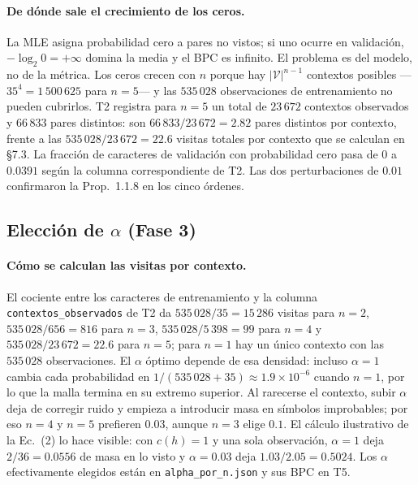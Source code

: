 \documentclass[11pt,letterpaper]{article}
\begin{document}
	\paragraph{De dónde sale el crecimiento de los ceros.}
	La MLE asigna probabilidad cero a pares no vistos; si uno ocurre en validación, $-\log_2 0 = +\infty$ domina la media y el BPC es infinito. El problema es del modelo, no de la métrica. Los ceros crecen con $n$ porque hay $|\mathcal{V}|^{n-1}$ contextos posibles ---$35^4 = 1\,500\,625$ para $n = 5$--- y las $535\,028$ observaciones de entrenamiento no pueden cubrirlos. T2 registra para $n = 5$ un total de $23\,672$ contextos observados y $66\,833$ pares distintos: son $66\,833 / 23\,672 = 2.82$ pares distintos por contexto, frente a las $535\,028 / 23\,672 = 22.6$ visitas totales por contexto que se calculan en \S 7.3. La fracción de caracteres de validación con probabilidad cero pasa de $0$ a $0.0391$ según la columna correspondiente de T2. Las dos perturbaciones de $0.01$ confirmaron la Prop.~1.1.8 en los cinco órdenes.
	
	\subsection{Elección de $\alpha$ (Fase 3)}
	
	\paragraph{Cómo se calculan las visitas por contexto.}
	El cociente entre los caracteres de entrenamiento y la columna \texttt{contextos\_observados} de T2 da $535\,028 / 35 = 15\,286$ visitas para $n = 2$, $535\,028 / 656 = 816$ para $n = 3$, $535\,028 / 5\,398 = 99$ para $n = 4$ y $535\,028 / 23\,672 = 22.6$ para $n = 5$; para $n = 1$ hay un único contexto con las $535\,028$ observaciones. El $\alpha$ óptimo depende de esa densidad: incluso $\alpha = 1$ cambia cada probabilidad en $1 / (535\,028 + 35) \approx 1.9 \times 10^{-6}$ cuando $n = 1$, por lo que la malla termina en su extremo superior. Al rarecerse el contexto, subir $\alpha$ deja de corregir ruido y empieza a introducir masa en símbolos improbables; por eso $n = 4$ y $n = 5$ prefieren $0.03$, aunque $n = 3$ elige $0.1$. El cálculo ilustrativo de la Ec.~(2) lo hace visible: con $c(h) = 1$ y una sola observación, $\alpha = 1$ deja $2 / 36 = 0.0556$ de masa en lo visto y $\alpha = 0.03$ deja $1.03 / 2.05 = 0.5024$. Los $\alpha$ efectivamente elegidos están en \texttt{alpha\_por\_n.json} y sus BPC en T5.
	
\end{document}
